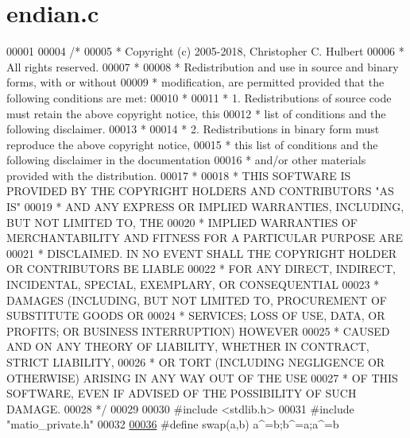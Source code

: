 \hypertarget{endian_8c_source}{}\section{endian.\+c}
\label{endian_8c_source}

\begin{DoxyCode}
00001 
00004 \textcolor{comment}{/*}
00005 \textcolor{comment}{ * Copyright (c) 2005-2018, Christopher C. Hulbert}
00006 \textcolor{comment}{ * All rights reserved.}
00007 \textcolor{comment}{ *}
00008 \textcolor{comment}{ * Redistribution and use in source and binary forms, with or without}
00009 \textcolor{comment}{ * modification, are permitted provided that the following conditions are met:}
00010 \textcolor{comment}{ *}
00011 \textcolor{comment}{ * 1. Redistributions of source code must retain the above copyright notice, this}
00012 \textcolor{comment}{ *    list of conditions and the following disclaimer.}
00013 \textcolor{comment}{ *}
00014 \textcolor{comment}{ * 2. Redistributions in binary form must reproduce the above copyright notice,}
00015 \textcolor{comment}{ *    this list of conditions and the following disclaimer in the documentation}
00016 \textcolor{comment}{ *    and/or other materials provided with the distribution.}
00017 \textcolor{comment}{ *}
00018 \textcolor{comment}{ * THIS SOFTWARE IS PROVIDED BY THE COPYRIGHT HOLDERS AND CONTRIBUTORS "AS IS"}
00019 \textcolor{comment}{ * AND ANY EXPRESS OR IMPLIED WARRANTIES, INCLUDING, BUT NOT LIMITED TO, THE}
00020 \textcolor{comment}{ * IMPLIED WARRANTIES OF MERCHANTABILITY AND FITNESS FOR A PARTICULAR PURPOSE ARE}
00021 \textcolor{comment}{ * DISCLAIMED. IN NO EVENT SHALL THE COPYRIGHT HOLDER OR CONTRIBUTORS BE LIABLE}
00022 \textcolor{comment}{ * FOR ANY DIRECT, INDIRECT, INCIDENTAL, SPECIAL, EXEMPLARY, OR CONSEQUENTIAL}
00023 \textcolor{comment}{ * DAMAGES (INCLUDING, BUT NOT LIMITED TO, PROCUREMENT OF SUBSTITUTE GOODS OR}
00024 \textcolor{comment}{ * SERVICES; LOSS OF USE, DATA, OR PROFITS; OR BUSINESS INTERRUPTION) HOWEVER}
00025 \textcolor{comment}{ * CAUSED AND ON ANY THEORY OF LIABILITY, WHETHER IN CONTRACT, STRICT LIABILITY,}
00026 \textcolor{comment}{ * OR TORT (INCLUDING NEGLIGENCE OR OTHERWISE) ARISING IN ANY WAY OUT OF THE USE}
00027 \textcolor{comment}{ * OF THIS SOFTWARE, EVEN IF ADVISED OF THE POSSIBILITY OF SUCH DAMAGE.}
00028 \textcolor{comment}{ */}
00029 
00030 \textcolor{preprocessor}{#include <stdlib.h>}
00031 \textcolor{preprocessor}{#include "matio\_private.h"}
00032 
\hyperlink{endian_8c_a3ca5ecd34b04d6a243c054ac3a57f68d}{00036} \textcolor{preprocessor}{#define swap(a,b)   a^=b;b^=a;a^=b}

\end{DoxyCode}
